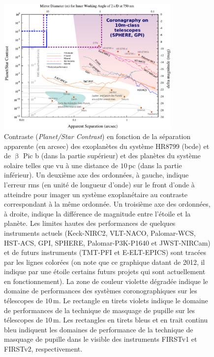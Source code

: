 \begin{figure}[ht!]
    \centering
    \includegraphics[width=0.8\textwidth]{Figure_Chap1/Mawet2012_ContrastVSSeparation_InstruPerformances_02.png}
    \caption[Contraste en fonction de la séparation apparente de certaines exoplanètes imagées et des planètes du système solaire.]{Contraste (\textit{Planet/Star Contrast}) en fonction de la séparation apparente (en arcsec) des exoplanètes du système HR8799 (bcde) et de $\upbeta$ Pic b (dans la partie supérieur) et des planètes du système solaire telles que vu à une distance de $10 \,$pc (dans la partie inférieur). Un deuxième axe des ordonnées, à gauche, indique l'erreur rms (en unité de longueur d'onde) sur le front d'onde à atteindre pour imager un système exoplanétaire au contraste correspondant à la même ordonnée. Un troisième axe des ordonnées, à droite, indique la différence de magnitude entre l'étoile et la planète. Les limites hautes des performances de quelques instruments actuels (Keck-NIRC2, VLT-NACO, Palomar-WCS, HST-ACS, GPI, SPHERE, Palomar-P3K-P1640 et JWST-NIRCam) et de futurs instruments (TMT-PFI et E-ELT-EPICS) sont tracées par les lignes colorées (on note que ce graphique datant de 2012, il indique par une étoile certains futurs projets qui sont actuellement en fonctionnement). La zone de couleur violette dégradée indique le domaine de performances des systèmes coronographiques sur les télescopes de $10 \,$m. Le rectangle en tirets violets indique le domaine de performances de la technique de masquage de pupille sur les télescopes de $10 \,$m. Les rectangles en tirets bleus et en trait continu bleu indiquent les domaines de performance de la technique de masquage de pupille dans le visible des instruments FIRSTv1 et FIRSTv2, respectivement.}
    \label{fig:ContrastSeparation}
\end{figure}

